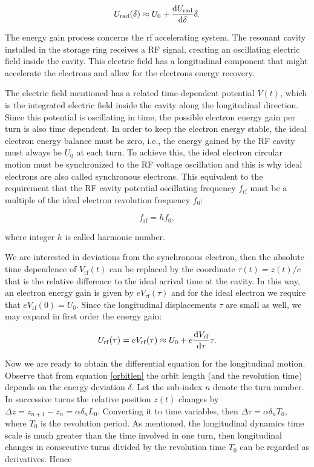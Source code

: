\begin{equation}
    U_{\mathrm{rad}}(\delta) \approx U_0 + \dfrac{\mathrm{d} U_{\mathrm{rad}}}{\mathrm{d} \delta}\delta.
    \label{approx1}
\end{equation}

The energy gain process concerns the \gls{rf} accelerating system. The resonant cavity installed in the storage ring receives a RF signal, creating an oscillating electric field inside the cavity. This electric field has a longitudinal component that might accelerate the electrons and allow for the electrons energy recovery.

The electric field mentioned has a related time-dependent potential $V(t)$, which is the integrated electric field inside the cavity along the longitudinal direction. Since this potential is oscillating in time, the possible electron energy gain per turn is also time dependent. In order to keep the electron energy stable, the ideal electron energy balance must be zero, i.e., the energy gained by the RF cavity must always be $U_0$ at each turn. To achieve this, the ideal electron circular motion must be synchronized to the RF voltage oscillation and this is why ideal electrons are also called synchronous electrons. This equivalent to the requirement that the RF cavity potential oscillating frequency $f_{\mathrm{rf}}$ must be a multiple of the ideal electron revolution frequency $f_0$:

\begin{equation}
    f_{\mathrm{rf}} = h f_0,
\end{equation}

where integer $h$ is called harmonic number.

We are interested in deviations from the synchronous electron, then the absolute time dependence of $V_{\mathrm{rf}}(t)$ can be replaced by the coordinate $\tau(t) = z(t)/c$ that is the relative difference to the ideal arrival time at the cavity. In this way, an electron energy gain is given by $eV_{\mathrm{rf}}(\tau)$ and for the ideal electron we require that $eV_{\mathrm{rf}}(0) = U_0$. Since the  longitudinal displacements $\tau$ are small as well, we may expand in first order the energy gain:

\begin{equation}
    U_{\mathrm{rf}}(\tau) = eV_{\mathrm{rf}}(\tau) \approx U_0 + e\dfrac{\mathrm{d} V_{\mathrm{rf}}}{\mathrm{d} \tau}\tau.
    \label{approx2}
\end{equation}

Now we are ready to obtain the differential equation for the longitudinal motion. Observe that from equation \eqref{orbitlen} the orbit length (and the revolution time) depends on the energy deviation $\delta$. Let the sub-index $n$ denote the turn number. In successive turns the relative position $z(t)$ changes by $\Delta z = z_{n+1} - z_n = \alpha\delta_n L_0$. Converting it to time variables, then $\Delta \tau = \alpha \delta_n T_0$, where $T_0$ is the revolution period. As mentioned, the longitudinal dynamics time scale is much greater than the time involved in one turn, then longitudinal changes in consecutive turns divided by the revolution time $T_0$ can be regarded as derivatives. Hence

